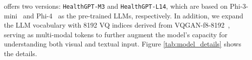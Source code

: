 \ourmethod{} offers two versions: \texttt{HealthGPT-M3} and \texttt{HealthGPT-L14}, which are based on Phi-3-mini~\cite{abdin2024phi} and Phi-4~\cite{abdin2024phi} as the pre-trained LLMs, respectively. In addition, we expand the LLM vocabulary with 8192 VQ indices derived from VQGAN-f8-8192~\cite{esser2021taming}, serving as multi-modal tokens to further augment the model's capacity for understanding both visual and textual input. Figure \ref{tab:model_details} shows the details.
\begin{table}[h!]
    \centering
    \vspace{-1mm}
    \caption{Overview of the Components of \ourmethod{}.}
    \label{tab:model_details}
\end{table}
\vspace{-2mm}
